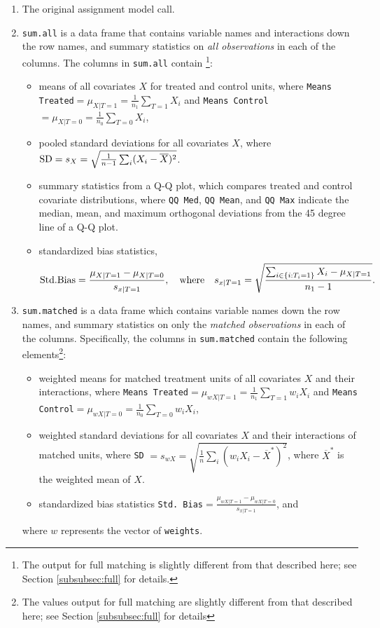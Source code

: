 \documentclass[oneside,letterpaper,titlepage]{article}
\begin{document}
\begin{enumerate}
\item The original assignment model call.
\item \texttt{sum.all} is a data frame that contains variable names
  and interactions down the row names, and summary statistics on
  \emph{all observations} in each of the columns.  The columns in
  \texttt{sum.all} contain \footnote{The output for full matching is
    slightly different from that described here; see Section
    \ref{subsubsec:full} for details.}:
  \begin{itemize}
  \item means of all covariates $X$ for treated and control units,
    where \texttt{Means Treated}$= \mu_{X|T=1} = \frac{1}{n_1}
    \sum_{T=1} X_i$ and \texttt{Means Control}$= \mu_{X|T=0} =
    \frac{1}{n_0} \sum_{T=0} X_i$,
  \item pooled standard deviations for all covariates $X$, where ${\rm
      SD} = s_X = \sqrt{\frac{1}{n-1} \sum_{i} (X_i -
      \overline{X})^2}$.
  \item summary statistics from a Q-Q plot, which compares treated and
    control covariate distributions, where \texttt{QQ Med}, \texttt{QQ
      Mean}, and \texttt{QQ Max} indicate the median, mean, and
    maximum orthogonal deviations from the 45 degree line of a Q-Q
    plot.
  \item standardized bias statistics, $${\rm Std.
      Bias}=\frac{\mu_{X|T=1} - \mu_{X|T=0}}{s_{x|T=1}}, \quad {\rm
      where} \quad s_{x|T=1} = \sqrt{\frac{\sum_{i \in \{i: T_i=1\}}
        X_i - \mu_{X|T=1}}{n_1-1} }.$$
  \end{itemize}
  
\item \texttt{sum.matched} is a data frame which contains variable
  names down the row names, and summary statistics on only the
  \emph{matched observations} in each of the columns.  Specifically,
  the columns in \texttt{sum.matched} contain the following
  elements\footnote{The values output for full matching are slightly
    different from that described here; see Section \ref{subsubsec:full}
    for details}:
  \begin{itemize}
  \item weighted means for matched treatment units of all covariates
    $X$ and their interactions, where \texttt{Means Treated}$=
    \mu_{wX|T=1} = \frac{1}{n_1} \sum_{T=1} w_iX_i$ and \texttt{Means
      Control}$=\mu_{wX|T=0} = \frac{1}{n_0} \sum_{T=0} w_iX_i$,
  \item weighted standard deviations for all covariates $X$ and their
    interactions of matched units, where \texttt{SD} $= s_{wX} =
    \sqrt{\frac{1}{n} \sum_{i} (w_iX_i - \overline{X}^*)^2}$, where
    $\overline{X}^*$ is the weighted mean of $X$.
  \item standardized bias statistics \texttt{Std.
      Bias}$=\frac{\mu_{wX|T=1} - \mu_{wX|T=0}}{s_{x|T=1}}$, and
  \end{itemize}
  where $w$ represents the vector of \texttt{weights}.
  

\end{enumerate}
\end{document}
